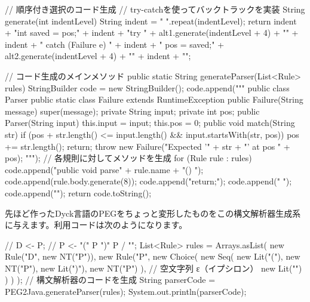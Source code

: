 \begin{codescreen}{}
{{        // 順序付き選択のコード生成
        // try-catchを使ってバックトラックを実装
        String generate(int indentLevel) {
            String indent = " ".repeat(indentLevel);
            return indent + "int saved = pos;\n"
                + indent + "try {\n"
                + alt1.generate(indentLevel + 4) + "\n"
                + indent + "} catch (Failure e) {\n"
                + indent + "    pos = saved;\n"
                + alt2.generate(indentLevel + 4) + "\n"
                + indent + "}";
        }
    }
    
    // コード生成のメインメソッド
    public static String generateParser(List<Rule> rules) {
        StringBuilder code = new StringBuilder();
        code.append("""
            public class Parser {
                public static class Failure extends RuntimeException {
                    public Failure(String message) {
                        super(message);
                    }
                }
                private String input;
                private int pos;
                public Parser(String input) {
                    this.input = input;
                    this.pos = 0;
                }
                public void match(String str) {
                    if (pos + str.length() <= input.length() &&
                        input.startsWith(str, pos)) {
                        pos += str.length();
                        return;
                    }
                    throw new Failure("Expected '" + str + "' at pos " + pos);
                }
            """);
        // 各規則に対してメソッドを生成
        for (Rule rule : rules) {
            code.append("\n    public void parse" + rule.name + "() {\n");
            code.append(rule.body.generate(8));
            code.append("\n        return;\n");
            code.append("    }\n");
        }
        code.append("}\n");
        return code.toString();
    }
}
\end{codescreen}

先ほど作ったDyck言語のPEGをちょっと変形したものをこの構文解析器生成系に与えます。利用コードは次のようになります。

\begin{codescreen}{}
// D <- P;
// P <- "(" P ")" P / "";
List<Rule> rules = Arrays.asList(
    new Rule("D", new NT("P")),
    new Rule("P", 
        new Choice(
            new Seq(
                new Lit("("),
                new NT("P"),
                new Lit(")"),
                new NT("P")
            ),
            // 空文字列 ε（イプシロン）
            new Lit("")
         )
    )
);
// 構文解析器のコードを生成
String parserCode = PEG2Java.generateParser(rules);
System.out.println(parserCode);
\end{codescreen}

